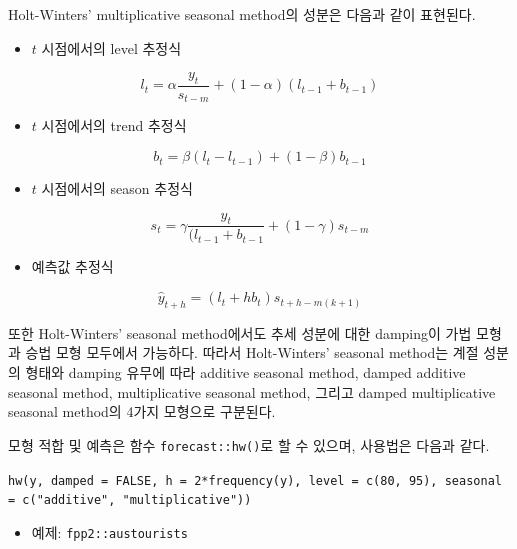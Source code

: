 \documentclass[
]{book}
\providecommand{\tightlist}{%
  \setlength{\itemsep}{0pt}\setlength{\parskip}{0pt}}
\begin{document}
Holt-Winters' multiplicative seasonal method의 성분은 다음과 같이 표현된다.

\begin{itemize}
\tightlist
\item
  \(t\) 시점에서의 level 추정식
\end{itemize}

\begin{equation}
l_{t} = \alpha \frac{y_{t}}{s_{t-m}} + (1-\alpha)(l_{t-1}+b_{t-1})
\end{equation}

\begin{itemize}
\tightlist
\item
  \(t\) 시점에서의 trend 추정식
\end{itemize}

\begin{equation}
b_{t} = \beta (l_{t} - l_{t-1}) + (1-\beta)b_{t-1}
\end{equation}

\begin{itemize}
\tightlist
\item
  \(t\) 시점에서의 season 추정식
\end{itemize}

\begin{equation}
s_{t} = \gamma \frac{y_{t}}{(l_{t-1} + b_{t-1}} + (1-\gamma) s_{t-m}
\end{equation}

\begin{itemize}
\tightlist
\item
  예측값 추정식
\end{itemize}

\begin{equation}
\hat{y}_{t+h} = (l_{t} + hb_{t}) s_{t+h-m(k+1)}
\end{equation}

또한 Holt-Winters' seasonal method에서도 추세 성분에 대한 damping이 가법 모형과 승법 모형 모두에서 가능하다. 따라서 Holt-Winters' seasonal method는 계절 성분의 형태와 damping 유무에 따라 additive seasonal method, damped additive seasonal method, multiplicative seasonal method, 그리고 damped multiplicative seasonal method의 4가지 모형으로 구분된다.

모형 적합 및 예측은 함수 \texttt{forecast::hw()}로 할 수 있으며, 사용법은 다음과 같다.

\texttt{hw(y,\ damped\ =\ FALSE,\ h\ =\ 2*frequency(y),\ level\ =\ c(80,\ 95),\ seasonal\ =\ c("additive",\ "multiplicative"))}

\begin{itemize}
\tightlist
\item
  예제: \texttt{fpp2::austourists}
\end{itemize}
\end{document}
